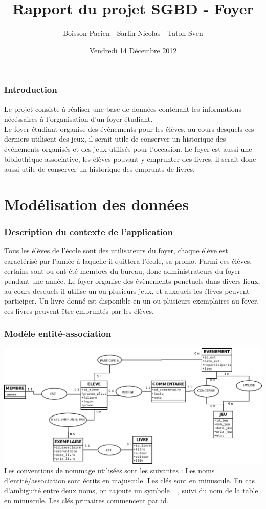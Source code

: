\documentclass[a4paper, 11pt]{article}
\title{Rapport du projet SGBD - Foyer}
\author{Boisson Pacien - Sarlin Nicolas - Taton Sven}
\date{Vendredi 14 Décembre 2012}
\begin{document}
\maketitle
\tableofcontents
\newpage
\section{Introduction}
Le projet consiste à réaliser une base de données contenant les informations nécéssaires à l'organisation d'un foyer étudiant.\\
Le foyer étudiant organise des évènements pour les élèves, au cours desquels ces derniers utilisent des jeux, il serait utile de conserver un historique des évènements organisés et des jeux utilisés pour l'occasion. Le foyer est aussi une bibliothèque associative, les élèves pouvant y emprunter des livres, il serait donc aussi utile de conserver un historique des emprunts de livres.
\newpage
\part{Modélisation des données}
\setcounter{section}{0}
\section{Description du contexte de l'application}
Tous les élèves de l'école sont des utilisateurs du foyer, chaque élève est caractérisé par l'année à laquelle il quittera l'école, sa promo. Parmi ces élèves, certains sont ou ont été membres du bureau, donc administrateurs du foyer pendant une année. Le foyer organise des évènements ponctuels dans divers lieux, au cours desquels il utilise un ou plusieurs jeux, et auxquels les élèves peuvent participer. Un livre donné est disponible en un ou plusieurs exemplaires au foyer, ces livres peuvent être empruntés par les élèves.
\section{Modèle entité-association}
\includegraphics[width=1\textwidth]{ER.png}
Les conventions de nommage utilisées sont les suivantes : Les noms d'entité/association sont écrits en majuscule. Les clés sont en minuscule. En cas d'ambigu\"ité entre deux noms, on rajoute un symbole \_, suivi du nom de la table en minuscule. Les clés primaires commencent par id.
\end{document}
